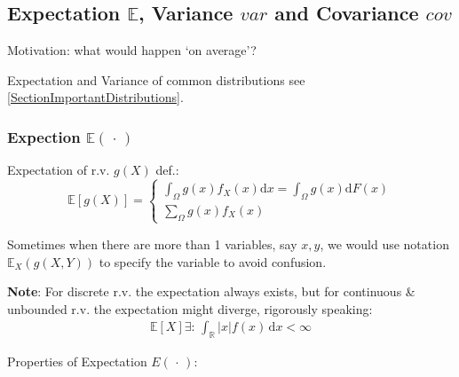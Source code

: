 \subsection{Expectation $\mathbb{E}$, Variance $var$ and Covariance $cov$}
Motivation: what would happen `on average'?

Expectation and Variance of common distributions see \autoref{SectionImportantDistributions}.

\subsubsection{Expection $ \mathbb{E}(\,\cdot\,) $}
    Expectation of r.v. $g(X)$ def.:
    \begin{equation}
    \mathbb{E} [g(X)]=\begin{cases}
        {\displaystyle\int_\Omega g(x) f_X(x)\mathrm{d}x=\int_\Omega g(x)\mathrm{d}F(x)}\\
        {\displaystyle\sum_{\Omega}g(x)f_X(x)}
    \end{cases}
\end{equation}

    Sometimes when there are more than 1 variables, say $ x,y $, we would use notation $ \mathbb{E}_X\left( g(X,Y) \right)  $ to specify the variable to avoid confusion.

    \textbf{Note}: For discrete r.v. the expectation always exists, but for continuous \& unbounded r.v. the expectation might diverge, rigorously speaking:
    \begin{align}
        \mathbb{E}\left[ X \right]\exists:\, \int_{\mathbb{R}}|x|f(x)\,\mathrm{d}x<\infty  
    \end{align}
    
    
 
\begin{point}
    Properties of Expectation $E(\,\cdot\,)$:
\end{point}

